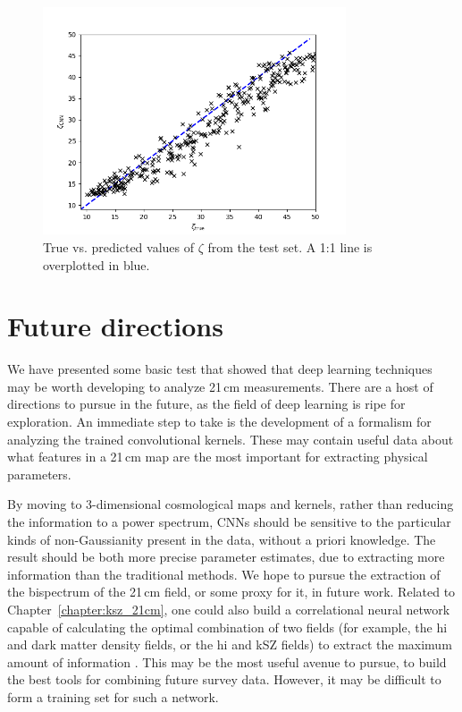 \begin{figure}
\centering
\includegraphics[width=0.8\textwidth]{chapters/hera_ml/figures/CompareZeta.png}
\caption[True vs. predicted values of $\zeta$ from the test set.]{True vs. predicted values of $\zeta$ from the test set. A 1:1 line is overplotted in blue.}
\label{fig:compare-zeta}
\end{figure}

\section{Future directions}

We have presented some basic test that showed that deep learning techniques may be worth developing to analyze 21\,cm measurements. There are a host of directions to pursue in the future, as the field of deep learning is ripe for exploration. An immediate step to take is the development of a formalism for analyzing the trained convolutional kernels. These may contain useful data about what features in a 21\,cm map are the most important for extracting physical parameters. 

By moving to 3-dimensional cosmological maps and kernels, rather than reducing the information to a power spectrum, CNNs should be sensitive to the particular kinds of non-Gaussianity present in the data, without a priori knowledge. The result should be both more precise parameter estimates, due to extracting more information than the traditional methods. We hope to pursue the extraction of the bispectrum of the 21\,cm field, or some proxy for it, in future work.
Related to Chapter~\ref{chapter:ksz_21cm}, one could also build a correlational neural network \citep{Chandar.15} capable of calculating the optimal combination of two fields (for example, the {\sc hi} and dark matter density fields, or the {\sc hi} and kSZ fields) to extract the maximum amount of information \citep{Feng.04}. This may be the most useful avenue to pursue, to build the best tools for combining future survey data. However, it may be difficult to form a training set for such a network.

